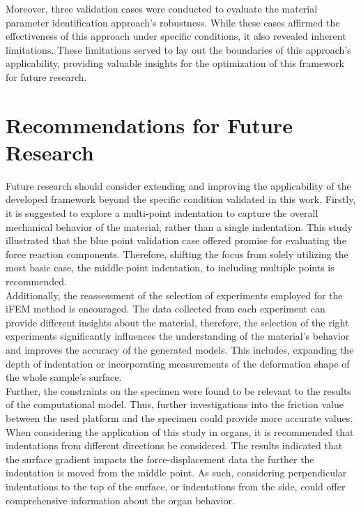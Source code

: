 Moreover, three validation cases were conducted to evaluate the material parameter identification 
approach's robustness. While these cases affirmed the effectiveness of this approach under 
specific conditions, it also revealed inherent limitations. These limitations served to 
lay out the boundaries of this approach's applicability, providing valuable insights for the 
optimization of this framework for future research.

\section{Recommendations for Future Research}
Future research should consider extending and improving the applicability of the developed 
framework beyond the specific condition validated in this work. Firstly, it is suggested to explore 
a multi-point indentation to capture the overall mechanical behavior of the material, rather than a 
single indentation. This study illustrated that the blue point validation case offered promise 
for evaluating the force reaction components. Therefore, shifting the focus from solely utilizing 
the most basic case, the middle point indentation, to including multiple points is recommended.\\

Additionally, the reassessment of the selection of experiments employed for the iFEM method is 
encouraged. The data collected from each experiment can provide different insights about the material, therefore, 
the selection of the right experiments significantly influences the understanding of the material's behavior and 
improves the accuracy of the generated models. This includes, expanding the depth of indentation or incorporating 
measurements of the deformation shape of the whole sample's surface.\\

Further, the constraints on the specimen were found to be relevant to the results of the computational model.
Thus, further investigations into the friction value between the used platform and the specimen could 
provide more accurate values.\\

When considering the application of this study in organs, it is recommended that indentations from 
different directions be considered. The results indicated that the surface gradient impacts the force-displacement data the
further the indentation is moved from the middle point. As such, considering perpendicular indentations to the top 
of the surface, or indentations from the side, could offer comprehensive information about the organ behavior.\\

